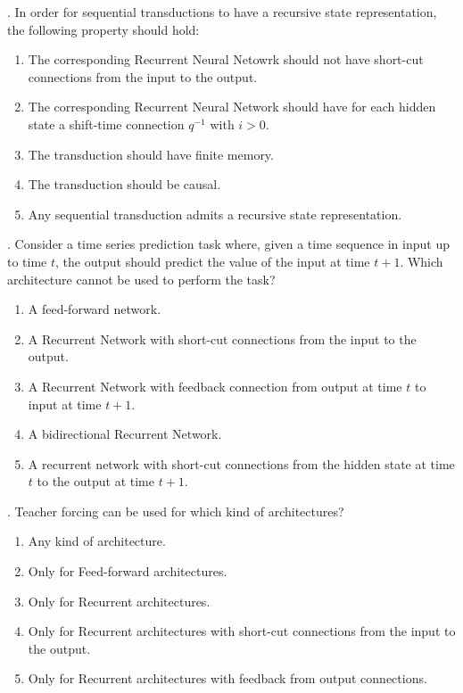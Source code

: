 . In order for sequential transductions to have a recursive state representation, the following property should hold:

\begin{enumerate}
    \item The corresponding Recurrent Neural Netowrk should not have short-cut connections from the input to the output.
    \item The corresponding Recurrent Neural Network should have for each hidden state a shift-time connection $q^{-1}$ with $i > 0$.
    \item The transduction should have finite memory.
    \item The transduction should be causal.
    \item Any sequential transduction admits a recursive state representation.
\end{enumerate}


. Consider a time series prediction task where, given a time sequence in input up to time $t$, the output should predict the value of the input at time $t+1$. Which architecture cannot be used to perform the task?

\begin{enumerate}[label=\roman*]
    \item A feed-forward network.
    \item A Recurrent Network with short-cut connections from the input to the output.
    \item A Recurrent Network with feedback connection from output at time $t$ to input at time $t+1$.
    \item A bidirectional Recurrent Network.
    \item A recurrent network with short-cut connections from the hidden state at time $t$ to the output at time $t+1$.
\end{enumerate}

\newpage
{}. Teacher forcing can be used for which kind of architectures?

\begin{enumerate}[label=\roman*]
    \item Any kind of architecture.
    \item Only for Feed-forward architectures.
    \item Only for Recurrent architectures.
    \item Only for Recurrent architectures with short-cut connections from the input to the output.
    \item Only for Recurrent architectures with feedback from output connections.
\end{enumerate}

